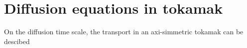 \section{Diffusion equations in tokamak}

On the diffusion time scale, the transport in an axi-simmetric tokamak can be descibed